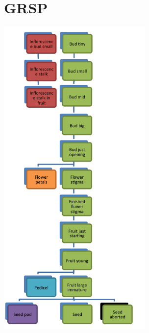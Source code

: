 \documentclass[10pt]{book} %
\begin{document}
\section{GRSP}
\begin{multicols}{2}
\includegraphics[width=3in]{images/GRSP.png}
\vfill
\columnbreak



\end{multicols}




\clearpage
\newpage
\end{document}
